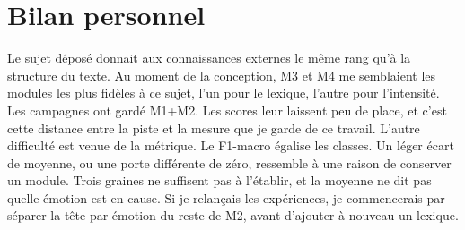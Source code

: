 \section*{Bilan personnel}
Le sujet déposé donnait aux connaissances externes le même rang qu'à la
structure du texte. Au moment de la conception, M3 et M4 me semblaient
les modules les plus fidèles à ce sujet, l'un pour le lexique, l'autre
pour l'intensité. Les campagnes ont gardé M1+M2. Les scores leur
laissent peu de place, et c'est cette distance entre la piste et la
mesure que je garde de ce travail. L'autre difficulté
est venue de la métrique. Le F1-macro égalise les classes. Un léger
écart de moyenne, ou une porte différente de zéro, ressemble à une
raison de conserver un module. Trois graines ne suffisent pas à
l'établir, et la moyenne ne dit pas quelle émotion est en cause. Si je
relançais les expériences, je commencerais par séparer la
tête par émotion du reste de M2, avant d'ajouter à nouveau un lexique.
